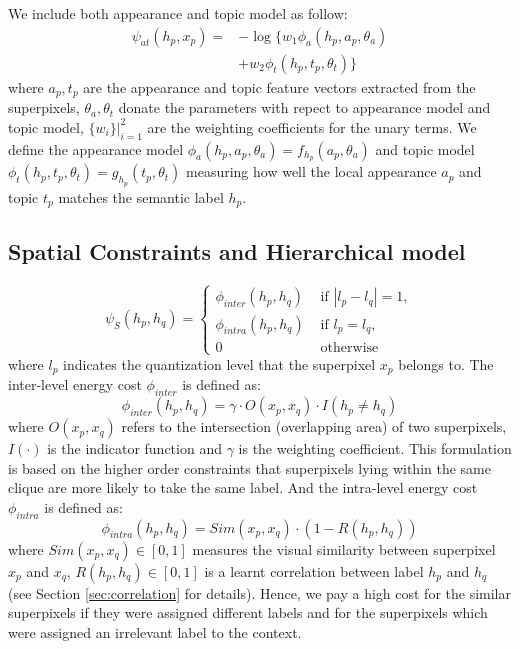 We include both appearance and topic model as follow:
\begin{equation}
    \begin{aligned}
        \psi_{at}(h_p,x_p) = &- \log \big\{ w_1\phi_a(h_p,a_p,\theta_a) \\
        &+ w_2\phi_t(h_p,t_p,\theta_t) \big\}
    \end{aligned}
\end{equation}
where $a_p, t_p$ are the appearance and topic feature vectors extracted from the superpixels, $\theta_a, \theta_t$ donate the parameters with repect to appearance model and topic model, $\{w_i\}|_{i=1}^2$ are the weighting coefficients for the unary terms. We define the appearance model $\phi_a(h_p,a_p,\theta_a) = f_{h_p}(a_p,\theta_a)$ and topic model $\phi_t(h_p,t_p,\theta_t) = g_{h_p}(t_p,\theta_t)$ measuring how well the local appearance $a_p$ and topic $t_p$ matches the semantic label $h_p$.

\subsection{Spatial Constraints and Hierarchical model}

\begin{equation}
    \psi_{S}(h_p,h_q) =
    \begin{cases}
        \phi_{inter}(h_p,h_q) &\mbox{ if } | l_p - l_q | = 1,
        \\
        \phi_{intra}(h_p,h_q) &\mbox{ if } l_p = l_q,
        \\
        0 &\mbox{ otherwise }
    \end{cases}
\end{equation}
where $l_p$ indicates the quantization level that the superpixel $x_p$ belongs to.
The inter-level energy cost $\phi_{inter}$ is defined as:
\begin{equation}
    \phi_{inter}(h_p,h_q) = \gamma \cdot O(x_p,x_q) \cdot I(h_p \neq h_q)
\end{equation}
where $O(x_p,x_q)$ refers to the intersection (overlapping area) of two superpixels, $I(\cdot)$ is the indicator function and $\gamma$ is the weighting coefficient. This formulation is based on the higher order constraints \cite{kohli2009robust,ladicky2009associative} that superpixels lying within the same clique are more likely to take the same label.
And the intra-level energy cost $\phi_{intra}$ is defined as:
\begin{equation}
    \phi_{intra}(h_p,h_q) = Sim(x_p,x_q) \cdot (1-R(h_p,h_q))
\end{equation}
where $Sim(x_p,x_q) \in [0,1]$ measures the visual similarity between superpixel $x_p$ and $x_q$, $R(h_p,h_q) \in [0,1]$ is a learnt correlation between label $h_p$ and $h_q$ (see Section \ref{sec:correlation} for details). Hence, we pay a high cost for the similar superpixels if they were assigned different labels and for the superpixels which were assigned an irrelevant label to the context.

